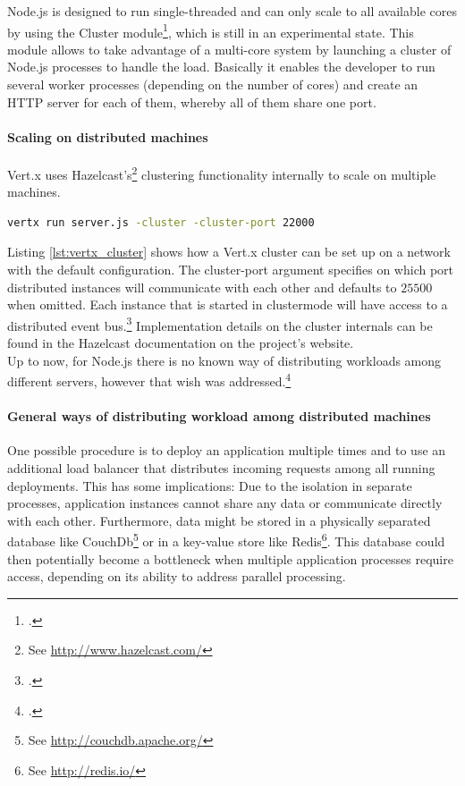 Node.js is designed to run single-threaded and can only scale to all available
cores by using the Cluster module\footcite[Cf.][]{node_2012b}, which is still in an experimental state.
This module allows to take advantage of a multi-core system by launching a cluster of Node.js processes to handle the load. Basically it enables the developer to run several worker processes (depending on the number of cores) and create an HTTP server for each of them, whereby all of them share one port. 


\paragraph{Scaling on distributed machines}
Vert.x uses Hazelcast's\footnote{See \url{http://www.hazelcast.com/}} clustering
functionality internally to scale on multiple machines.\\

\begin{lstlisting}[language=bash,caption={Starting a Vert.x application in cluster mode},label={lst:vertx_cluster}]
vertx run server.js -cluster -cluster-port 22000
\end{lstlisting}

Listing \ref{lst:vertx_cluster} shows how a Vert.x cluster can be set up on a
network with the default configuration. The cluster-port argument specifies on
which port distributed instances will communicate with each other and defaults
to $25500$ when omitted.
Each instance that is started in clustermode will have access to a distributed
event bus.\footcite[Cf.][]{vertx_2012} Implementation details on the cluster
internals can be found in the Hazelcast documentation on the project's
website.\\

Up to now, for Node.js there is no known way of distributing workloads among
different servers, however that wish was
addressed.\footcite[Cf.][]{node_clusterserver}


\paragraph{General ways of distributing workload among distributed machines}
One possible procedure is to deploy an application multiple times and to use an additional load balancer that
distributes incoming requests among all running deployments. This has some
implications: Due to the isolation in separate processes, application instances cannot share any
data or communicate directly with each other.
Furthermore, data might be stored in a physically separated database like CouchDb\footnote{See
\url{http://couchdb.apache.org/}} or in a key-value store like Redis\footnote{See
\url{http://redis.io/}}. This database could then potentially become a bottleneck when multiple application
processes require access, depending on its ability to address parallel processing.

